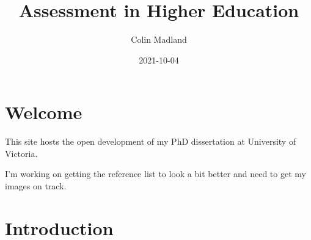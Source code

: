 \documentclass[
]{book}
\title{Assessment in Higher Education}
\author{Colin Madland}
\date{2021-10-04}
\begin{document}
\maketitle

{
\setcounter{tocdepth}{1}
\tableofcontents
}
\hypertarget{welcome}{%
\chapter*{Welcome}\label{welcome}}

This site hosts the open development of my PhD dissertation at University of Victoria.

I'm working on getting the reference list to look a bit better and need to get my images on track.

\hypertarget{introduction}{%
\chapter*{Introduction}\label{introduction}}
\end{document}
